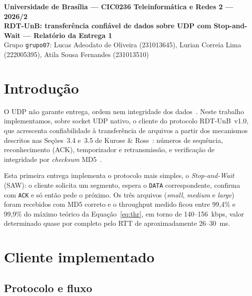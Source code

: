 \documentclass[11pt,a4paper]{article}
\begin{document}
\begin{center}
  {\large\textbf{Universidade de Brasília --- CIC0236 Teleinformática e Redes 2 --- 2026/2}}\\[0.5em]
  {\Large\textbf{RDT-UnB: transferência confiável de dados sobre UDP com Stop-and-Wait --- Relatório da Entrega 1}}\\[0.5em]
  Grupo \texttt{grupo07}: Lucas Adeodato de Oliveira (231013645), Lurian Correia Lima (222005395), Atila Sousa Fernandes (231013510)
\end{center}

\section{Introdução}

O UDP não garante entrega, ordem nem integridade dos dados~\cite{rfc768}. Neste
trabalho implementamos, sobre socket UDP nativo, o cliente do protocolo RDT-UnB~v1.0,
que acrescenta confiabilidade à transferência de arquivos a partir dos mecanismos
descritos nas Seções~3.4 e~3.5 de Kurose \& Ross~\cite{kurose}: números de sequência,
reconhecimento (ACK), temporizador e retransmissão, e verificação de integridade por
\textit{checksum} MD5~\cite{rfc1321}.

Esta primeira entrega implementa o protocolo mais simples, o \textit{Stop-and-Wait}
(SAW): o cliente solicita um segmento, espera o \texttt{DATA} correspondente, confirma
com \texttt{ACK} e só então pede o próximo. Os três arquivos (\textit{small}, \textit{medium} e \textit{large}) foram recebidos
com MD5 correto e o throughput medido ficou entre 99,4\% e 99,9\% do máximo teórico
da Equação~\ref{eq:thr}, em torno de 140--156~kbps, valor determinado quase por completo pelo
RTT de aproximadamente 26--30~ms.

\section{Cliente implementado}

\subsection{Protocolo e fluxo}
\end{document}

